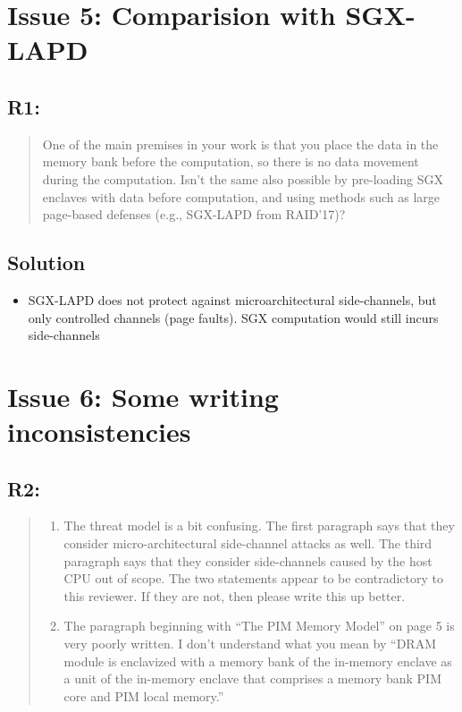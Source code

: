 \documentclass[11pt]{article}
\begin{document}
\section{Issue 5: Comparision with SGX-LAPD}
\label{sec:orgd36ea8f}
\subsection{R1:}
\label{sec:org47ce0f5}
\begin{quote}
One of the main premises in your work is that you place the data in the memory bank before the computation, so there is no data movement during the computation. Isn't the same also possible by pre-loading SGX enclaves with data before computation, and using methods such as large page-based defenses (e.g., SGX-LAPD from RAID'17)?
\end{quote}
\subsection{Solution}
\label{sec:org68995b1}
\begin{itemize}
\item SGX-LAPD does not protect against microarchitectural side-channels, but only controlled channels (page faults). SGX computation would still incurs side-channels
\end{itemize}
\section{Issue 6: Some writing inconsistencies}
\label{sec:org452b6be}
\subsection{R2:}
\label{sec:org0b71bc7}
\begin{quote}
\begin{enumerate}
\item The threat model is a bit confusing. The first paragraph says that they consider micro-architectural side-channel attacks as well. The third paragraph says that they consider side-channels caused by the host CPU out of scope. The two statements appear to be contradictory to this reviewer. If they are not, then please write this up better.
\item The paragraph beginning with ``The PIM Memory Model'' on page 5 is very poorly written. I don't understand what you mean by ``DRAM module is enclavized with a memory bank of the in-memory enclave as a unit of the in-memory enclave that comprises a memory bank PIM core and PIM local memory.''
\end{enumerate}
\end{quote}
\end{document}
